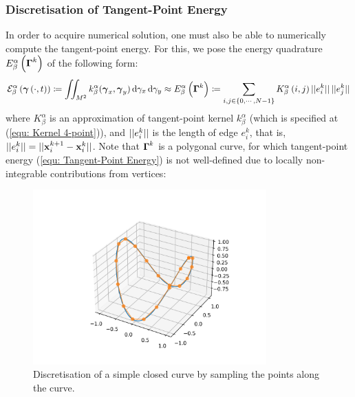 \documentclass[../dissertation.tex]{subfiles}
\begin{document}
\subsubsection{Discretisation of Tangent-Point Energy}
In order to acquire numerical solution, one must also be able to numerically compute the tangent-point energy.
For this, we pose the energy quadrature $E_{\beta}^{\alpha} \left( \boldsymbol{\Gamma}^k \right)$ of the following form:
\begin{equation}
    \mathcal{E}_{\beta}^{\alpha} \left( \boldsymbol{\gamma} \left( \cdot, t \right) \right) \coloneqq
    \iint_{M^2} k_{\beta}^{\alpha} (\boldsymbol{\gamma}_x, \boldsymbol{\gamma}_y) \, \text{d} \gamma_x \, \text{d} \gamma_y
    \approx
    E_{\beta}^{\alpha} \left( \boldsymbol{\Gamma}^k \right) \coloneqq
    \sum_{i, j \in \left\{ 0, \cdots, N-1 \right\}} K_{\beta}^{\alpha} \left( i, j \right) \lvert \lvert e_i^k \rvert \rvert \, \lvert \lvert e_j^k \rvert \rvert
    \label{equ: Energy Approximation Form}
\end{equation}
where
$K_{\beta}^{\alpha}$ is an approximation of tangent-point kernel $k_{\beta}^{\alpha}$ (which is specified at (\ref{equ: Kernel 4-point})), 
and $\lvert \lvert e_i^k \rvert \rvert$ is the length of edge $e_i^k$, that is, $\lvert \lvert e_i^k \rvert \rvert = \lvert \lvert \mathbf{x}_i^{k+1} - \mathbf{x}_i^k \rvert \rvert$.
Note that $\boldsymbol{\Gamma}^k$ is a polygonal curve, for which tangent-point energy (\ref{equ: Tangent-Point Energy}) is not well-defined due to locally non-integrable contributions from vertices:

\begin{figure}[tbp]
    \centering
    \includegraphics[width=0.8\textwidth]{sections/discretizationImgs/discretization}
    \caption{Discretisation of a simple closed curve by sampling the points along the curve.}
    \label{fig: Discretization of Curve}
\end{figure}
\end{document}
